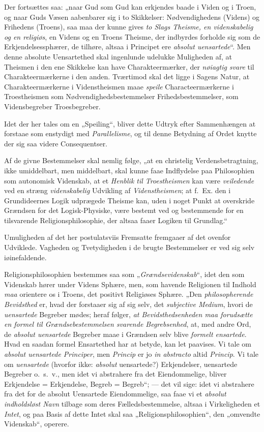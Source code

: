 \documentclass[12pt,a4paper]{book}
\newcommand{\opage}[1]{\marginnote{\footnotesize\textit{[#1]}}}
\begin{document}
Der fortsættes saa: „naar Gud som Gud kan erkjendes baade i Viden og i Troen, og naar Guds Væsen
\opage{205}aabenbarer sig i to Skikkelser: Nødvendighedens (Videns) og Frihedens (Troens), saa maa der
kunne gives \emph{to Slags Theisme, en videnskabelig og en religiøs}, en Videns og en Troens
Theisme, der indbyrdes forholde sig som de Erkjendelsessphærer, de tilhøre, altsaa i Principet
ere \emph{absolut uensartede}“. Men denne absolute Uensartethed skal ingenlunde udelukke
Muligheden af, at Theismen i den ene Skikkelse kan have Charakteermærker, der \emph{nøiagtig svare} til
Charakteermærkerne i den anden. Tværtimod skal det ligge i Sagens Natur, at Charakteermærkerne i
Videnstheismen maae \emph{speile} Characteermærkerne i Troestheismen som Nødvendighedsbestemmelser
Frihedsbestemmelser, som Vidensbegreber Troesbegreber.

Idet der her tales om en „Speiling“, bliver dette Udtryk efter Sammenhængen at forstaae som
enstydigt med \emph{Parallelisme}, og til denne Betydning af Ordet knytte der sig saa videre
Consequentser.

Af de givne Bestemmelser skal nemlig følge, „at en christelig Verdensbetragtning, ikke
umiddelbart, men middelbart, skal kunne faae Indflydelse paa Philosophien som autonomisk
Videnskab, at et \emph{Henblik til Troestheismen} kan være \emph{veiledende} ved en stræng \emph{videnskabelig} Udvikling af \emph{Videnstheismen}; at f.\ Ex. den i Grundideernes Logik udprægede Theisme kan,
uden i noget Punkt at overskride Grændsen for det Logisk-Physiske, være bestemt ved og
bestemmende for en tilsvarende Religionsphilosophie, der altsaa faaer Logiken til Grundlag.“

Umuligheden af det her postulatsviis Fremsatte fremgaaer af det ovenfor Udviklede. Vagheden og
Tvetydigheden i de brugte Bestemmelser er ved sig selv iøinefaldende.

Religionsphilosophien bestemmes saa som „\emph{Grændsevidenskab}“, idet den som Videnskab hører under
Videns Sphære, men, som havende Religionen til Indhold \emph{maa} orientere os i Troens, det positivt
Religiøses Sphære. „Den \emph{philosopherende Bevidsthed} er, hvad der forstaaer sig af sig selv, det \emph{subjective Medium}, hvori de \emph{uensartede} Begreber mødes; heraf følger, \emph{at Be\opage{206}vidsthedsenheden maa forudsætte en formel til Grændsebestemmelsen svarende Begrebsenhed}, at, med andre Ord,
de \emph{absolut uensartede} Begreber maae i Grændsen selv blive \emph{formelt ensartede}. Hvad en
saadan formel Ensartethed har at betyde, kan let paavises. Vi tale om \emph{absolut uensartede
Principer}, men \emph{Princip} er jo \emph{\textit{in abstracto}} altid \emph{Princip}. Vi tale om \emph{uensartede} (hvorfor ikke: \emph{absolut} uensartede?) Erkjendelser, uensartede Begreber o.\ s.\ v., men idet vi abstrahere
fra det Eiendommelige, bliver Erkjendelse = Erkjendelse, Begreb = Begreb“; --- det vil sige: idet
vi abstrahere fra det for de absolut Uensartede Eiendommelige, saa faae vi et \emph{absolut
indholdsløst Navn} tilbage som deres Fælledsbestemmelse, altsaa i Virkeligheden et \emph{Intet}, og paa
Basis af dette Intet skal saa „Religionsphilosophien“, den „omvendte Videnskab“, operere.
\end{document}
